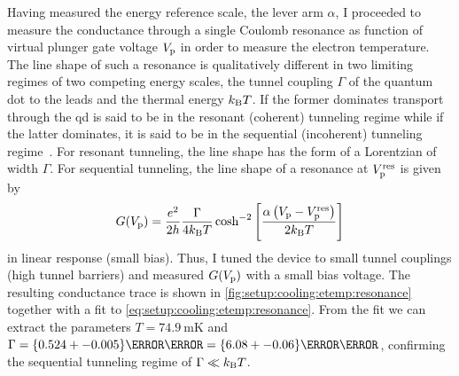 Having measured the energy reference scale, the lever arm $\alpha$, I proceeded to measure the conductance through a single Coulomb resonance as function of virtual plunger gate voltage $V_{\mathrm{p}}$ in order to measure the electron temperature.
The line shape of such a resonance is qualitatively different in two limiting regimes of two competing energy scales, the tunnel coupling $\Gamma$ of the quantum dot to the leads and the thermal energy $k_{\mathrm{B}} T$.
If the former dominates transport through the \gls{qd} is said to be in the resonant (coherent) tunneling regime while if the latter dominates, it is said to be in the sequential (incoherent) tunneling regime~\cite{Ihn2009}.
For resonant tunneling, the line shape has the form of a Lorentzian of width $\Gamma$.
For sequential tunneling, the line shape of a resonance at $V_{\mathrm{p}}^{\mathrm{res}}$ is given by
\begin{equation}\label{eq:setup:cooling:etemp:resonance}
    G(V_{\mathrm{p}}) = \frac{e^2}{2h}\frac{\Gamma}{4k_{\mathrm{B}} T}\cosh^{-2}\left[\frac{\alpha\left(V_{\mathrm{p}} - V_{\mathrm{p}}^{\mathrm{res}}\right)}{2k_{\mathrm{B}} T}\right]
\end{equation}
in linear response (small bias).
Thus, I tuned the device to small tunnel couplings (high tunnel barriers) and measured $G(V_{\mathrm{p}})$ with a small bias voltage.
The resulting conductance trace is shown in \cref{fig:setup:cooling:etemp:resonance} together with a fit to \cref{eq:setup:cooling:etemp:resonance}.
From the fit we can extract the parameters $T = \qty{74.9}{\milli\kelvin}$ and $\Gamma = \qty{0.524+-0.005}{\micro\eV} = \qty{6.08+-0.06}{\milli\kelvin}$, confirming the sequential tunneling regime of $\Gamma\ll k_{\mathrm{B}} T$.

